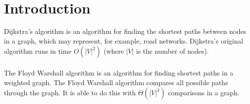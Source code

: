 \documentclass[14pt]{article}
\begin{document}
\newpage
\section*{Introduction}
\vspace{20 mm}
Dijkstra's algorithm is an algorithm for finding the shortest paths between nodes in a graph, which may represent, for example, road networks. Dijkstra's original algorithm runs in time ${\displaystyle O(|V|^{2})}$ (where ${\displaystyle |V|}$ is the number of nodes).
\\\vspace{10 mm}
\\
The Floyd Warshall algorithm is an algorithm for finding shortest paths in a weighted graph. The Floyd Warshall algorithm compares all possible paths through the graph.  It is able to do this with ${\displaystyle \Theta (|V|^{3})}$ comparisons in a graph.  



\newpage
\end{document}
